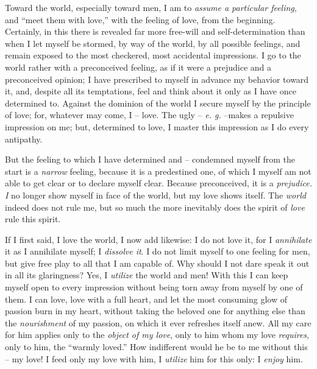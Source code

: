 \documentclass[12pt,a4paper]{book}
\begin{document}
Toward the world, especially toward men, I am to \textit{assume a particular 
feeling}, and ``meet them with love,'' with the feeling of love, from the 
beginning. Certainly, in this there is revealed far more free-will and 
self-determination than when I let myself be stormed, by way of the world, by 
all possible feelings, and remain exposed to the most checkered, most 
accidental impressions. I go to the world rather with a preconceived feeling, 
as if it were a prejudice and a preconceived opinion; I have prescribed to 
myself in advance my behavior toward it, and, despite all its temptations, 
feel and think about it only as I have once determined to. Against the 
dominion of the world I secure myself by the principle of love; for, whatever 
may come, I -- love. The ugly -- \textit{e. g.} --makes a repulsive impression 
on me; but, determined to love, I master this impression as I do every 
antipathy.

But the feeling to which I have determined and -- condemned myself from the 
start is a \textit{narrow} feeling, because it is a predestined one, of which 
I myself am not able to get clear or to declare myself clear. Because 
preconceived, it is a \textit{prejudice. I} no longer show myself in face of 
the world, but my love shows itself. The \textit{world} indeed does not rule 
me, but so much the more inevitably does the spirit of \textit{love} rule this 
spirit.

If I first said, I love the world, I now add likewise: I do not love it, for I 
\textit{annihilate} it as I annihilate myself; I \textit{dissolve it}. I do 
not limit myself to one feeling for men, but give free play to all that I am 
capable of. Why should I not dare speak it out in all its glaringness? Yes, I 
\textit{utilize} the world and men! With this I can keep myself open to every 
impression without being torn away from myself by one of them. I can love, 
love with a full heart, and let the most consuming glow of passion burn in my 
heart, without taking the beloved one for anything else than the 
\textit{nourishment} of my passion, on which it ever refreshes itself anew. 
All my care for him applies only to the \textit{object of my love}, only to 
him whom my love \textit{requires}, only to him, the ``warmly loved.'' How 
indifferent would he be to me without this -- my love! I feed only my love 
with him, I \textit{utilize} him for this only: I \textit{enjoy} him.
\end{document}
